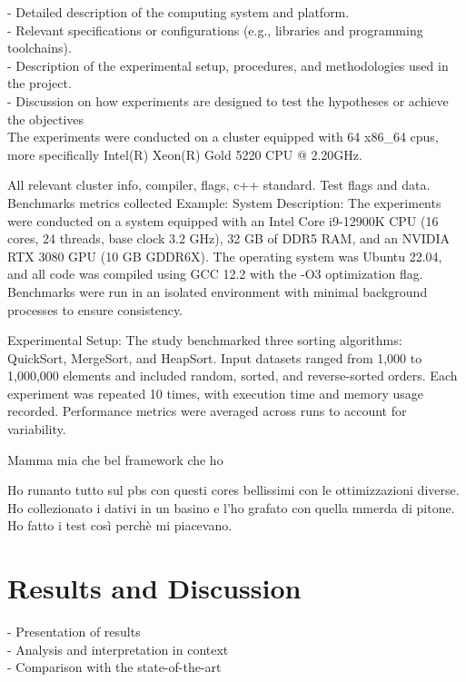 \documentclass[conference]{IEEEtran}
\begin{document}
- Detailed description of the computing system and platform. \\
- Relevant specifications or configurations (e.g., libraries
and programming toolchains). \\
- Description of the experimental setup, procedures, and
methodologies used in the project. \\
- Discussion on how experiments are designed to test the hypotheses
or achieve the objectives \\

The experiments were conducted on a cluster equipped with 64 x86\_64 cpus, more specifically Intel(R) Xeon(R) Gold 5220 CPU @ 2.20GHz.



All relevant cluster info, compiler, flags, c++ standard. Test flags and data. Benchmarks metrics collected
Example:
System Description:
The experiments were conducted on a system equipped with an Intel Core i9-12900K CPU (16 cores, 24 threads, base clock 3.2 GHz), 32 GB of DDR5 RAM, and an NVIDIA RTX 3080 GPU (10 GB GDDR6X). The operating system was Ubuntu 22.04, and all code was compiled using GCC 12.2 with the -O3 optimization flag. Benchmarks were run in an isolated environment with minimal background processes to ensure consistency.

Experimental Setup:
The study benchmarked three sorting algorithms: QuickSort, MergeSort, and HeapSort. Input datasets ranged from 1,000 to 1,000,000 elements and included random, sorted, and reverse-sorted orders. Each experiment was repeated 10 times, with execution time and memory usage recorded. Performance metrics were averaged across runs to account for variability.

Mamma mia che bel framework che ho

Ho runanto tutto sul pbs con questi cores bellissimi con le ottimizzazioni diverse. Ho collezionato i dativi in un basino e l'ho grafato con quella mmerda di pitone. Ho fatto i test così perchè mi piacevano.

\section{Results and Discussion}

- Presentation of results \\
- Analysis and interpretation in context \\
- Comparison with the state-of-the-art \\
\end{document}
